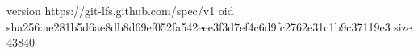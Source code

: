 version https://git-lfs.github.com/spec/v1
oid sha256:ae281b5d6ae8db8d69ef052fa542eee3f3d7ef4c6d9fc2762e31c1b9c37119e3
size 43840
